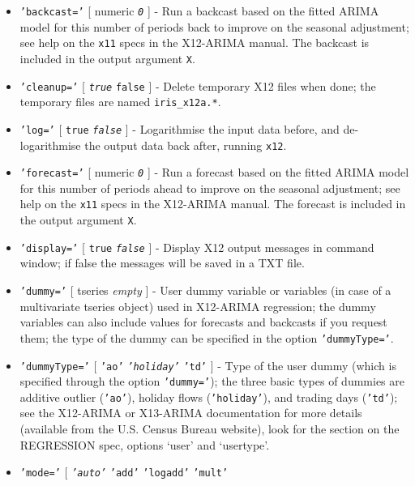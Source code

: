  \begin{itemize}
 \item
   \texttt{'backcast='} {[} numeric \textbar{} \emph{\texttt{0}} {]} -
   Run a backcast based on the fitted ARIMA model for this number of
   periods back to improve on the seasonal adjustment; see help on the
   \texttt{x11} specs in the X12-ARIMA manual. The backcast is included
   in the output argument \texttt{X}.
 \item
   \texttt{'cleanup='} {[} \emph{\texttt{true}} \textbar{} \texttt{false}
   {]} - Delete temporary X12 files when done; the temporary files are
   named \texttt{iris\_x12a.*}.
 \item
   \texttt{'log='} {[} \texttt{true} \textbar{} \emph{\texttt{false}} {]}
   - Logarithmise the input data before, and de-logarithmise the output
   data back after, running \texttt{x12}.
 \item
   \texttt{'forecast='} {[} numeric \textbar{} \emph{\texttt{0}} {]} -
   Run a forecast based on the fitted ARIMA model for this number of
   periods ahead to improve on the seasonal adjustment; see help on the
   \texttt{x11} specs in the X12-ARIMA manual. The forecast is included
   in the output argument \texttt{X}.
 \item
   \texttt{'display='} {[} \texttt{true} \textbar{} \emph{\texttt{false}}
   {]} - Display X12 output messages in command window; if false the
   messages will be saved in a TXT file.
 \item
   \texttt{'dummy='} {[} tseries \textbar{} \emph{empty} {]} - User dummy
   variable or variables (in case of a multivariate tseries object) used
   in X12-ARIMA regression; the dummy variables can also include values
   for forecasts and backcasts if you request them; the type of the dummy
   can be specified in the option \texttt{'dummyType='}.
 \item
   \texttt{'dummyType='} {[} \texttt{'ao'} \textbar{}
   \emph{\texttt{'holiday'}} \textbar{} \texttt{'td'} {]} - Type of the
   user dummy (which is specified through the option \texttt{'dummy='});
   the three basic types of dummies are additive outlier (\texttt{'ao'}),
   holiday flows (\texttt{'holiday'}), and trading days (\texttt{'td'});
   see the X12-ARIMA or X13-ARIMA documentation for more details
   (available from the U.S. Census Bureau website), look for the section
   on the REGRESSION spec, options `user' and `usertype'.
 \item
   \texttt{'mode='} {[} \emph{\texttt{'auto'}} \textbar{} \texttt{'add'}
   \textbar{} \texttt{'logadd'} \textbar{} \texttt{'mult'} \textbar{}

\end{itemize}
